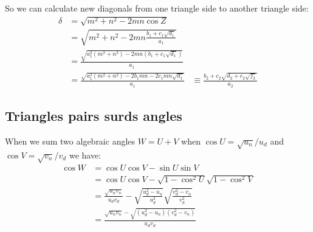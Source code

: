 \documentclass[11pt]{article}
\begin{document}
So we can calculate new diagonals from one triangle side to another triangle side:
\begin{align}
\delta &= \sqrt{m^2 + n^2 - 2mn\cos{Z}}\\
 &= \sqrt{m^2 + n^2 - 2mn\frac{b_1+c_1\sqrt{d_1}}{a_1}}\\
 &= \frac{\sqrt{a_1^2(m^2 + n^2) - 2mn(b_1 + c_1\sqrt{d_1})}}{a_1}\\
 &= \frac{\sqrt{a_1^2(m^2 + n^2) - 2b_1mn - 2c_1mn\sqrt{d_1} }}{a_1} &\equiv \frac{b_2 + c_2\sqrt{d_2 + e_2\sqrt{f_2}}}{a_2}
\end{align}

\subsection{Triangles pairs surds angles}

When we sum two algebraic angles $W = U+V$ when $\cos{U} = \sqrt{u_n}/u_d$ and $\cos{V} = \sqrt{v_n}/v_d$ we have:
\begin{align}
\cos{W} &= \cos{U}\cos{V} - \sin{U}\sin{V}\\
 &= \cos{U}\cos{V} - \sqrt{1 - \cos^2{U}}\sqrt{1 - \cos^2{V}}\\
 &= \frac{\sqrt{u_nv_n}}{u_dv_d} - \sqrt{\frac{u_d^2 - u_n}{u_d^2}} \sqrt{\frac{v_d^2 - v_n}{v_d^2}}\\
 &= \frac{\sqrt{u_nv_n} - \sqrt{(u_d^2 - u_n)(v_d^2 - v_n)} }{u_dv_d}
\end{align}
\end{document}
